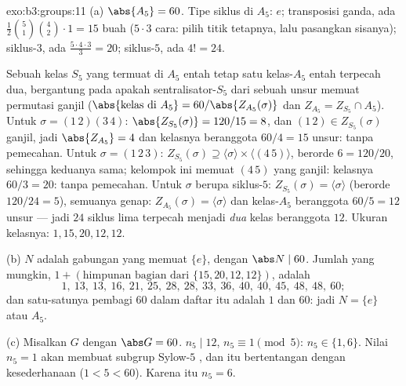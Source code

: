 \begin{solution}{exo:b3:groups:11}
(a) $\abs{A_5} = 60$. Tipe siklus di $A_5$: $e$; transposisi
ganda, ada $\frac{1}{2}\binom{5}{1}\binom{4}{2}\cdot 1 = 15$
buah ($5 \cdot 3$ cara: pilih titik tetapnya, lalu pasangkan sisanya);
siklus-$3$, ada $\frac{5 \cdot 4 \cdot 3}{3} = 20$; siklus-$5$, ada $4! =
24$.

Sebuah kelas $S_5$ yang termuat di $A_5$ entah tetap satu kelas-$A_5$
entah terpecah dua, bergantung pada apakah sentralisator-$S_5$ dari sebuah
unsur memuat permutasi ganjil ($\abs{\text{kelas di }A_5} =
60/\abs{Z_{A_5}(\sigma)}$ dan $Z_{A_5} = Z_{S_5} \cap A_5$).
Untuk $\sigma = (1\,2)(3\,4)$: $\abs{Z_{S_5}(\sigma)} = 120/15 = 8$,
dan $(1\,2) \in Z_{S_5}(\sigma)$ ganjil, jadi $\abs{Z_{A_5}} = 4$
dan kelasnya beranggota $60/4 = 15$ unsur: tanpa pemecahan. Untuk $\sigma =
(1\,2\,3)$: $Z_{S_5}(\sigma) \supseteq \langle \sigma \rangle
\times \langle (4\,5)\rangle$, berorde $6 = 120/20$, sehingga keduanya sama;
kelompok ini memuat $(4\,5)$ yang ganjil: kelasnya $60/3 = 20$: tanpa pemecahan. Untuk
$\sigma$ berupa siklus-$5$: $Z_{S_5}(\sigma) = \langle \sigma\rangle$
(berorde $120/24 = 5$), semuanya genap: $Z_{A_5}(\sigma) = \langle
\sigma\rangle$ dan kelas-$A_5$ beranggota $60/5 = 12$ unsur --- jadi
$24$ siklus lima terpecah menjadi \emph{dua} kelas beranggota $12$. Ukuran
kelasnya: $1, 15, 20, 12, 12$.

(b)  $N$ adalah gabungan 
yang memuat $\{e\}$, dengan $\abs N \mid 60$. Jumlah yang mungkin, $1 +
(\text{himpunan bagian dari } \{15, 20, 12, 12\})$, adalah
\[
1,\ 13,\ 13,\ 16,\ 21,\ 25,\ 28,\ 28,\ 33,\ 36,\ 40,\ 40,\ 45,\
48,\ 48,\ 60 ;
\]
dan satu-satunya pembagi $60$ dalam daftar itu adalah $1$ dan $60$: jadi $N =
\{e\}$ atau $A_5$.

(c) Misalkan $G$  dengan $\abs G = 60$. $n_5 \mid 12$, $n_5
\equiv 1 \pmod 5$: $n_5 \in \{1, 6\}$. Nilai $n_5 = 1$ akan membuat
subgrup Sylow-$5$ \omterm{def:b3:groups:normal}{normal}, dan itu bertentangan dengan kesederhanaan ($1 < 5 <
60$). Karena itu $n_5 = 6$.
\end{solution}

